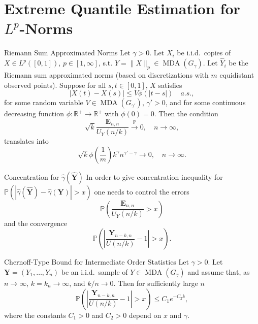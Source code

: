 \documentclass[11pt, aspectratio=169]{beamer}
\DeclareMathOperator{\mda}{MDA}
\begin{document}
\section{Extreme Quantile Estimation for $L^p$-Norms}

\begin{frame}{Riemann Sum Approximated Norms}
  Let $\gamma > 0$. Let $X_i$ be i.i.d.\ copies of $X\in L^p\left([0,1]\right)$,
  $p\in [1,\infty]$, s.t. $Y = \|X\|_p\in\mda\left(G_\gamma\right)$. Let $\hat
  Y_i$ be the Riemann sum approximated norms (based on discretizations with $m$
  equidistant observed points). Suppose for all $s,t\in [0,1]$, $X$ satisfies
  \begin{equation*}
    \left|X(t) - X(s)\right| \leq V\phi\left(|t-s|\right) \quad a.s.,
  \end{equation*}
  for some random variable $V\in\mda\left(G_{\gamma'}\right)$, $\gamma' > 0$,
  and for some continuous decreasing function $\phi:\mathbb{R}^+\to
  \mathbb{R}^+$ with $\phi\left(0\right) = 0$. Then the condition
  \begin{equation*}
    \sqrt{k}\frac{\bm E_{n,n}}{U_Y\left(n/k\right)}\stackrel{\mathbb{P}}{\to}0,
    \quad n\to\infty,
  \end{equation*}
  translates into
  \begin{equation*}
    \sqrt{k}\phi\left(\frac{1}{m}\right)k^\gamma n^{\gamma' - \gamma}\to 0,
    \quad n\to\infty.
  \end{equation*}
\end{frame}


\begin{frame}{Concentration for $\hat\gamma(\hat{\bm Y})$} In order to give
  concentration inequality for $\mathbb{P}\left(\left|\hat\gamma(\hat{\bm Y}) -
  \hat\gamma(\bm Y)\right| > x\right)$ one needs to control the errors
  \begin{equation*}
    \mathbb{P}\left(\frac{\bm E_{n,n}}{U_Y\left(n/k\right)} > x\right)
  \end{equation*}
  and the convergence
  \begin{equation*}
    \mathbb{P}\left(\left|\frac{\bm
    Y_{n-k,n}}{U(n/k)} - 1\right| > x\right).
  \end{equation*}
\end{frame}


\begin{frame}{Chernoff-Type Bound for Intermediate Order Statistics}
  Let $\gamma > 0$. Let $\bm Y = \left(Y_1, \ldots, Y_n\right)$ be an i.i.d.\
  sample of $Y\in\mda\left(G_\gamma\right)$ and assume that, as $n\to\infty$,
  $k=k_n\to\infty$, and $k/n\to 0$. Then for sufficiently large $n$
  \begin{equation*}
    \mathbb{P}\left(\left|\frac{\bm
    Y_{n-k,n}}{U(n/k)} - 1\right| > x\right)
    \leq C_1 e^{-C_2 k},
  \end{equation*} 
  where the constants $C_1 > 0$ and $C_2 > 0$ depend on $x$ and $\gamma$.
\end{frame}
\end{document}
